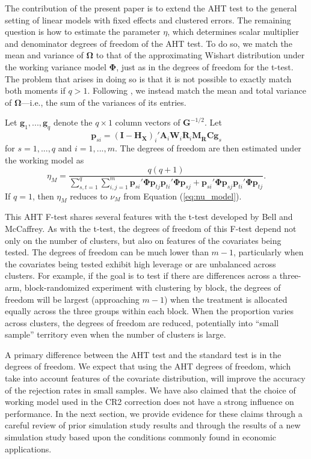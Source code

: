 \documentclass[draft]{ectaart}\usepackage[]{graphicx}\usepackage[]{color}
\newcommand{\bm}{\mathbf}
\newcommand{\bs}{\boldsymbol}
\begin{document}
The contribution of the present paper is to extend the AHT test to the general setting of linear models with fixed effects and clustered errors. 
The remaining question is how to estimate the parameter $\eta$, which determines scalar multiplier and denominator degrees of freedom of the AHT test. 
To do so, we match the mean and variance of $\bs\Omega$ to that of the approximating Wishart distribution under the working variance model $\bs\Phi$, just as in the degrees of freedom for the t-test. 
The problem that arises in doing so is that it is not possible to exactly match both moments if $q > 1$.
Following \citet{Tipton2015small-F}, we instead match the mean and total variance of $\bs\Omega$---i.e., the sum of the variances of its entries.

Let $\bm{g}_1,...,\bm{g}_q$ denote the $q \times 1$ column vectors of $\bm{G}^{-1/2}$. 
Let \[
\bm{p}_{si} = \left(\bm{I} - \bm{H_X}\right)_i' \bm{A}_i \bm{W}_i \bm{\ddot{R}}_i \bm{M_{\ddot{R}}}\bm{C} \bm{g}_s \]
for $s = 1,...,q$ and $i = 1,...,m$. 
The degrees of freedom are then estimated under the working model as
\begin{equation}
\label{eq:eta_model}
\eta_M = \frac{q(q + 1)}{\sum_{s,t=1}^q \sum_{i,j=1}^m \bm{p}_{si}'\bs\Phi\bm{p}_{tj} \bm{p}_{ti}'\bs\Phi\bm{p}_{sj} + \bm{p}_{si}'\bs\Phi\bm{p}_{sj} \bm{p}_{ti}'\bs\Phi\bm{p}_{tj}}.
\end{equation}
If $q = 1$, then $\eta_M$ reduces to $\nu_M$ from Equation (\ref{eq:nu_model}).

This AHT F-test shares several features with the t-test developed by Bell and McCaffrey. As with the t-test, the degrees of freedom of this F-test depend not only on the number of clusters, but also on features of the covariates being tested. 
The degrees of freedom can be much lower than $m - 1$, particularly when the covariates being tested exhibit high leverage or are unbalanced across clusters. 
For example, if the goal is to test if there are differences across a three-arm, block-randomized experiment with clustering by block, the degrees of freedom will be largest (approaching $m - 1$) when the treatment is allocated equally across the three groups within each block. 
When the proportion varies across clusters, the degrees of freedom are reduced, potentially into ``small sample'' territory even when the number of clusters is large. 

A primary difference between the AHT test and the standard test is in the degrees of freedom. We expect that using the AHT degrees of freedom, which take into account features of the covariate distribution, will improve the accuracy of the rejection rates in small samples. 
We have also claimed that the choice of working model used in the CR2 correction does not have a strong influence on performance. 
In the next section, we provide evidence for these claims through a careful review of prior simulation study results and through the results of a new simulation study based upon the conditions commonly found in economic applications.
\end{document}
